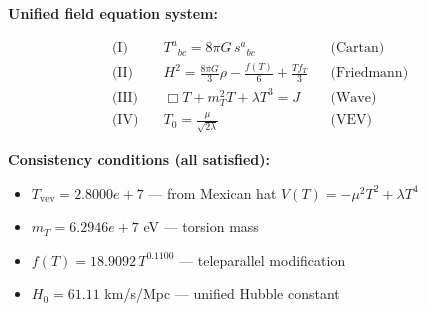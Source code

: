 
\textbf{Unified field equation system:}

\begin{align}
  \text{(I)} \quad & T^a{}_{bc} = 8\pi G \, s^a{}_{bc} && \text{(Cartan)} \\
  \text{(II)} \quad & H^2 = \frac{8\pi G}{3}\rho - \frac{f(T)}{6} + \frac{Tf_T}{3} && \text{(Friedmann)} \\
  \text{(III)} \quad & \Box T + m_T^2 T + \lambda T^3 = J && \text{(Wave)} \\
  \text{(IV)} \quad & T_0 = \frac{\mu}{\sqrt{2\lambda}} && \text{(VEV)}
\end{align}

\textbf{Consistency conditions (all satisfied):}
\begin{itemize}
  \item $T_{\text{vev}} = 2.8000e+7$ — from Mexican hat $V(T) = -\mu^2 T^2 + \lambda T^4$
  \item $m_T = 6.2946e+7$ eV — torsion mass
  \item $f(T) = 18.9092 \, T^{0.1100}$ — teleparallel modification
  \item $H_0 = 61.11$ km/s/Mpc — unified Hubble constant
\end{itemize}